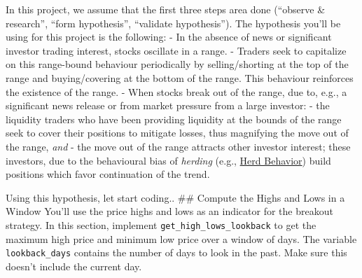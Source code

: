 \documentclass[11pt]{article}
\begin{document}
In this project, we assume that the first three steps area done
(``observe \& research'', ``form hypothesis'', ``validate hypothesis'').
The hypothesis you'll be using for this project is the following: - In
the absence of news or significant investor trading interest, stocks
oscillate in a range. - Traders seek to capitalize on this range-bound
behaviour periodically by selling/shorting at the top of the range and
buying/covering at the bottom of the range. This behaviour reinforces
the existence of the range. - When stocks break out of the range, due
to, e.g., a significant news release or from market pressure from a
large investor: - the liquidity traders who have been providing
liquidity at the bounds of the range seek to cover their positions to
mitigate losses, thus magnifying the move out of the range, \emph{and} -
the move out of the range attracts other investor interest; these
investors, due to the behavioural bias of \emph{herding} (e.g.,
\href{https://www.investopedia.com/university/behavioral_finance/behavioral8.asp}{Herd
Behavior}) build positions which favor continuation of the trend.

Using this hypothesis, let start coding.. \#\# Compute the Highs and
Lows in a Window You'll use the price highs and lows as an indicator for
the breakout strategy. In this section, implement
\texttt{get\_high\_lows\_lookback} to get the maximum high price and
minimum low price over a window of days. The variable
\texttt{lookback\_days} contains the number of days to look in the past.
Make sure this doesn't include the current day.
\end{document}
